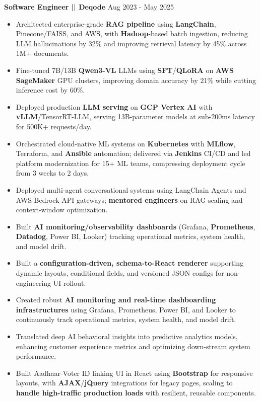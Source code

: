 \documentclass[a4paper]{article}
\begin{document}
\vspace{4pt}
\textbf{Software Engineer || Deqode}
\hfill Aug 2023 - May 2025
\begin{itemize}
\vspace{1pt}
\item {Architected enterprise-grade \textbf{RAG pipeline} using \textbf{LangChain}, Pinecone/FAISS, and AWS, with \textbf{Hadoop}-based batch ingestion, reducing LLM hallucinations by 32\% and improving retrieval latency by 45\% across 1M+ documents.}
\item {Fine-tuned 7B/13B \textbf{Qwen3-VL} LLMs using \textbf{SFT}/\textbf{QLoRA} on \textbf{AWS SageMaker} GPU clusters, improving domain accuracy by 21\% while cutting inference cost by 60\%.}
\item {Deployed production \textbf{LLM serving} on \textbf{GCP Vertex AI} with \textbf{vLLM}/TensorRT-LLM, serving 13B-parameter models at sub-200ms latency for 500K+ requests/day.}
\item {Orchestrated cloud-native ML systems on \textbf{Kubernetes} with \textbf{MLflow}, Terraform, and \textbf{Ansible} automation; delivered via \textbf{Jenkins} CI/CD and led platform modernization for 15+ ML teams, compressing deployment cycle from 3 weeks to 2 days.}
\item {Deployed multi-agent conversational systems using LangChain Agents and AWS Bedrock API gateways; \textbf{mentored engineers} on RAG scaling and context-window optimization.}
\item {Built \textbf{AI monitoring/observability dashboards} (Grafana, \textbf{Prometheus}, \textbf{Datadog}, Power BI, Looker) tracking operational metrics, system health, and model drift.}
\item {Built a \textbf{configuration-driven, schema-to-React renderer} supporting dynamic layouts, conditional fields, and versioned JSON configs for non-engineering UI rollout.}
\item {Created robust \textbf{AI monitoring and real-time dashboarding infrastructures} using Grafana, Prometheus, Power BI, and Looker to continuously track operational metrics, system health, and model drift.}
\item {Translated deep AI behavioral insights into predictive analytics models, enhancing customer experience metrics and optimizing down-stream system performance.}
\item {Built Aadhaar-Voter ID linking UI in React using \textbf{Bootstrap} for responsive layouts, with \textbf{AJAX}/\textbf{jQuery} integrations for legacy pages, scaling to \textbf{handle high-traffic production loads} with resilient, reusable components.}

\end{itemize}
\end{document}
